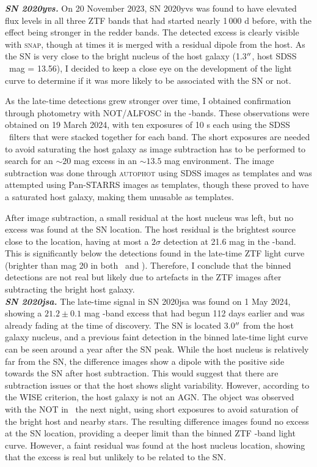 \documentclass[a4paper,oneside,12pt, class=Latex/Classes/PhDthesisPSnPDF, crop=false]{standalone}
\begin{document}
\textit{\textbf{SN 2020yvs.}}
On 20 November 2023, SN 2020yvs was found to have elevated flux levels in all three ZTF bands that had started nearly 1\,000 d before, with the effect being stronger in the redder bands. The detected excess is clearly visible with \textsc{snap}, though at times it is merged with a residual dipole from the host. As the SN is very close to the bright nucleus of the host galaxy (1.3$^{\prime\prime}$, host SDSS \ztfr\ mag = 13.56), I decided to keep a close eye on the development of the light curve to determine if it was more likely to be associated with the SN or not.

As the late-time detections grew stronger over time, I obtained confirmation through photometry with NOT/ALFOSC in the \ztfg\ztfr\ztfi-bands. These observations were obtained on 19 March 2024, with ten exposures of 10 s each using the SDSS \ztfg\ztfr\ztfi\ filters that were stacked together for each band. The short exposures are needed to avoid saturating the host galaxy as image subtraction has to be performed to search for an $\sim 20$ mag excess in an $\sim 13.5$ mag environment. The image subtraction was done through \textsc{autophot} \citep{Autophot} using SDSS images as templates and was attempted using Pan-STARRS images as templates, though these proved to have a saturated host galaxy, making them unusable as templates.

After image subtraction, a small residual at the host nucleus was left, but no excess was found at the SN location. The host residual is the brightest source close to the location, having at most a $2\sigma$ detection at 21.6 mag in the \ztfi-band. This is significantly below the detections found in the late-time ZTF light curve (brighter than mag 20 in both \ztfr\ and \ztfi). Therefore, I conclude that the binned detections are not real but likely due to artefacts in the ZTF images after subtracting the bright host galaxy.\\


\textit{\textbf{SN 2020jsa.}}
The late-time signal in SN 2020jsa was found on 1 May 2024, showing a $21.2\pm0.1$ mag \ztfr-band excess that had begun 112 days earlier and was already fading at the time of discovery. The SN is located 3.0$^{\prime\prime}$ from the host galaxy nucleus, and a previous faint detection in the binned late-time light curve can be seen around a year after the SN peak. While the host nucleus is relatively far from the SN, the difference images show a dipole with the positive side towards the SN after host subtraction. This would suggest that there are subtraction issues or that the host shows slight variability. However, according to the WISE criterion, the host galaxy is not an AGN. The object was observed with the NOT in \ztfg\ztfr\ztfi\ the next night, using short exposures to avoid saturation of the bright host and nearby stars. The resulting difference images found no excess at the SN location, providing a deeper limit than the binned ZTF \ztfr-band light curve. However, a faint residual was found at the host nucleus location, showing that the excess is real but unlikely to be related to the SN.\\
\end{document}
